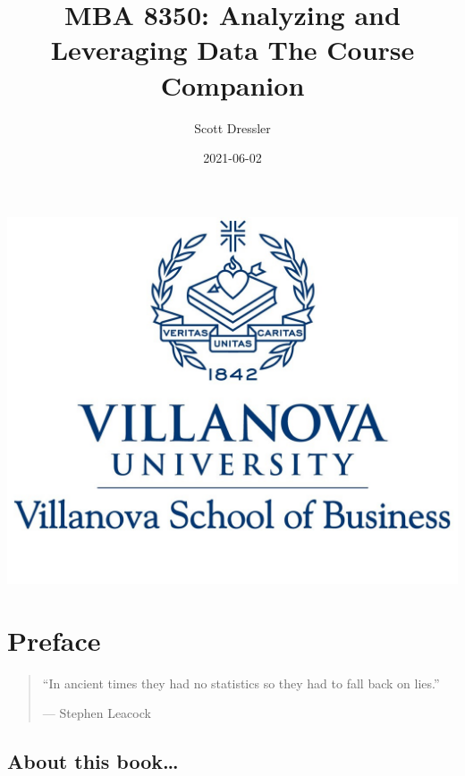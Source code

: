 \documentclass[
]{book}
\title{MBA 8350: Analyzing and Leveraging Data The Course Companion}
\author{Scott Dressler}
\date{2021-06-02}
\begin{document}
\maketitle

{
\setcounter{tocdepth}{1}
\tableofcontents
}
\hypertarget{section}{%
\chapter*{}\label{section}}

\begin{center}\includegraphics[width=14.36in]{images/VU17BLUE3} \end{center}

\hypertarget{preface}{%
\chapter*{Preface}\label{preface}}

\begin{quote}
``In ancient times they had no statistics so they had to fall back on lies.''

--- Stephen Leacock
\end{quote}

\hypertarget{about-this-book}{%
\section*{About this book\ldots{}}\label{about-this-book}}
\end{document}
